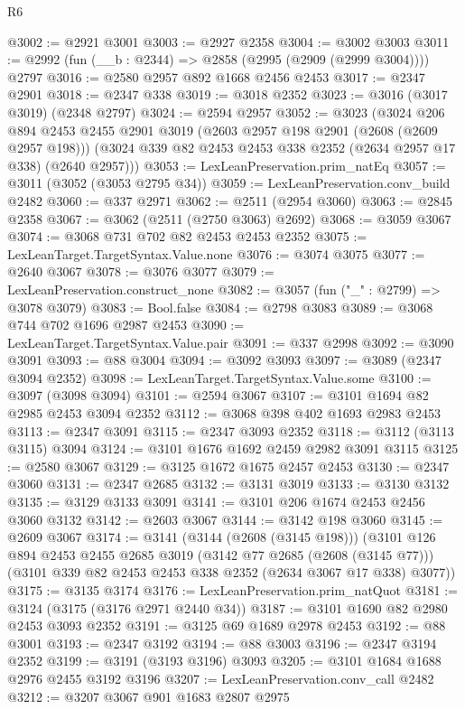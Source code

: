 \begin{lexlean}{R6}
\begin{coremodule}
@3002 := @2921 @3001
@3003 := @2927 @2358
@3004 := @3002 @3003
@3011 := @2992 (fun (__b : @2344) => @2858 (@2995 (@2909 (@2999 @3004)))) @2797
@3016 := @2580 @2957 @892 @1668 @2456 @2453
@3017 := @2347 @2901
@3018 := @2347 @338
@3019 := @3018 @2352
@3023 := @3016 (@3017 @3019) (@2348 @2797)
@3024 := @2594 @2957
@3052 := @3023
    (@3024
      @206
      @894
      @2453
      @2455
      @2901
      @3019
      (@2603 @2957 @198 @2901 (@2608 (@2609 @2957 @198)))
      (@3024 @339 @82 @2453 @2453 @338 @2352 (@2634 @2957 @17 @338) (@2640 @2957)))
@3053 := LexLeanPreservation.prim_natEq
@3057 := @3011 (@3052 (@3053 @2795 @34))
@3059 := LexLeanPreservation.conv_build @2482
@3060 := @337 @2971
@3062 := @2511 (@2954 @3060)
@3063 := @2845 @2358
@3067 := @3062 (@2511 (@2750 @3063) @2692)
@3068 := @3059 @3067
@3074 := @3068 @731 @702 @82 @2453 @2453 @2352
@3075 := LexLeanTarget.TargetSyntax.Value.none
@3076 := @3074 @3075
@3077 := @2640 @3067
@3078 := @3076 @3077
@3079 := LexLeanPreservation.construct_none
@3082 := @3057 (fun ("_" : @2799) => @3078 @3079)
@3083 := Bool.false
@3084 := @2798 @3083
@3089 := @3068 @744 @702 @1696 @2987 @2453
@3090 := LexLeanTarget.TargetSyntax.Value.pair
@3091 := @337 @2998
@3092 := @3090 @3091
@3093 := @88 @3004
@3094 := @3092 @3093
@3097 := @3089 (@2347 @3094 @2352)
@3098 := LexLeanTarget.TargetSyntax.Value.some
@3100 := @3097 (@3098 @3094)
@3101 := @2594 @3067
@3107 := @3101 @1694 @82 @2985 @2453 @3094 @2352
@3112 := @3068 @398 @402 @1693 @2983 @2453
@3113 := @2347 @3091
@3115 := @2347 @3093 @2352
@3118 := @3112 (@3113 @3115) @3094
@3124 := @3101 @1676 @1692 @2459 @2982 @3091 @3115
@3125 := @2580 @3067
@3129 := @3125 @1672 @1675 @2457 @2453
@3130 := @2347 @3060
@3131 := @2347 @2685
@3132 := @3131 @3019
@3133 := @3130 @3132
@3135 := @3129 @3133 @3091
@3141 := @3101 @206 @1674 @2453 @2456 @3060 @3132
@3142 := @2603 @3067
@3144 := @3142 @198 @3060
@3145 := @2609 @3067
@3174 := @3141
    (@3144 (@2608 (@3145 @198)))
    (@3101
      @126
      @894
      @2453
      @2455
      @2685
      @3019
      (@3142 @77 @2685 (@2608 (@3145 @77)))
      (@3101 @339 @82 @2453 @2453 @338 @2352 (@2634 @3067 @17 @338) @3077))
@3175 := @3135 @3174
@3176 := LexLeanPreservation.prim_natQuot
@3181 := @3124 (@3175 (@3176 @2971 @2440 @34))
@3187 := @3101 @1690 @82 @2980 @2453 @3093 @2352
@3191 := @3125 @69 @1689 @2978 @2453
@3192 := @88 @3001
@3193 := @2347 @3192
@3194 := @88 @3003
@3196 := @2347 @3194 @2352
@3199 := @3191 (@3193 @3196) @3093
@3205 := @3101 @1684 @1688 @2976 @2455 @3192 @3196
@3207 := LexLeanPreservation.conv_call @2482
@3212 := @3207 @3067 @901 @1683 @2807 @2975

\end{coremodule}
\end{lexlean}
